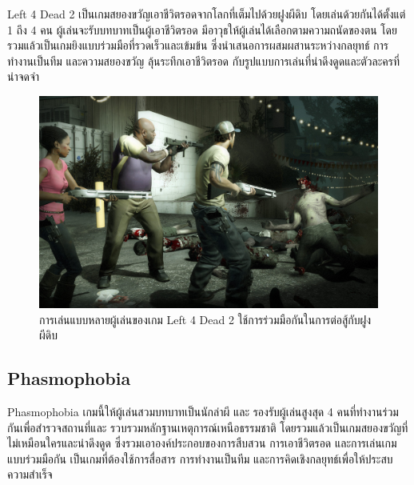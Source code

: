 Left 4 Dead 2 เป็นเกมสยองขวัญเอาชีวิตรอดจากโลกที่เต็มไปด้วยฝูงผีดิบ โดยเล่นด้วยกันได้ตั้งแต่ 1 ถึง 4 คน ผู้เล่นจะรับบทบาทเป็นผู้เอาชีวิตรอด มีอาวุธให้ผู้เล่นได้เลือกตามความถนัดของตน โดยรวมแล้วเป็นเกมยิงแบบร่วมมือที่รวดเร็วและเข้มข้น ซึ่งนำเสนอการผสมผสานระหว่างกลยุทธ์ การทำงานเป็นทีม และความสยองขวัญ ลุ้นระทึกเอาชีวิตรอด กับรูปแบบการเล่นที่น่าดึงดูดและตัวละครที่น่าจดจำ \cite{L4D2}

\begin{figure}[h]
  \begin{center}
  \includegraphics[width=\textwidth]{./img/l4d2.jpg}
  \end{center}
  \caption[ภาพเกม Left 4 Dead 2]{การเล่นแบบหลายผู้เล่นของเกม Left 4 Dead 2 ใช้การร่วมมือกันในการต่อสู้กับฝูงผีดิบ}
  \label{fig:L4D2}
\end{figure}
  

\subsection{Phasmophobia}

Phasmophobia เกมนี้ให้ผู้เล่นสวมบทบาทเป็นนักล่าผี และ รองรับผู้เล่นสูงสุด 4 คนที่ทำงานร่วมกันเพื่อสำรวจสถานที่และ รวบรวมหลักฐานเหตุการณ์เหนือธรรมชาติ โดยรวมแล้วเป็นเกมสยองขวัญที่ไม่เหมือนใครและน่าดึงดูด ซึ่งรวมเอาองค์ประกอบของการสืบสวน การเอาชีวิตรอด และการเล่นเกมแบบร่วมมือกัน เป็นเกมที่ต้องใช้การสื่อสาร การทำงานเป็นทีม และการคิดเชิงกลยุทธ์เพื่อให้ประสบความสำเร็จ \cite{Phasmophobia}

